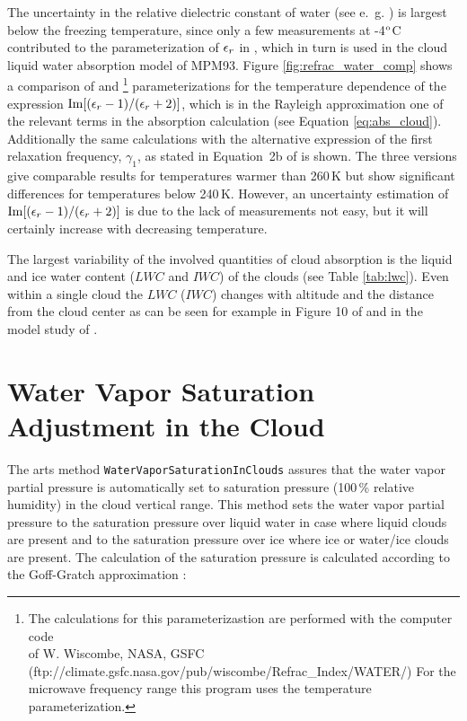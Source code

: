 The uncertainty in the relative dielectric constant of water 
(see e.~g. \citet{liptonetal:99}) is largest below the freezing 
temperature, since only a few measurements at -4$^{\rm o}$C 
contributed to the parameterization of $\epsilon_r$ in \citet{liebeetal:91}, 
which in turn is used in the cloud liquid water absorption model of MPM93. 
Figure \ref{fig:refrac_water_comp} shows a comparison of 
\citet{liebeetal:91} and \citet{ray:72}\footnote{{The calculations
  for this parameterizastion are performed with the computer code}\\{
   of W. Wiscombe, NASA, GSFC}\\
  (ftp://climate.gsfc.nasa.gov/pub/wiscombe/Refrac\_Index/WATER/)
  For the microwave frequency range this program uses the
  \citet{ray:72} temperature parameterization.} parameterizations 
for the temperature dependence of the expression
$\mathrm{Im}{[(\epsilon_r-1)/(\epsilon_r+2)]}$, which is in the Rayleigh approximation 
one of the relevant terms in the absorption calculation (see 
Equation \ref{eq:abs_cloud}). Additionally the same calculations with 
the alternative expression of the first  relaxation frequency, 
$\gamma_1$, as stated in Equation~2b of \citet{liebeetal:91} is shown. 
The three versions give comparable results for temperatures warmer 
than 260\,K but show significant  differences for temperatures below 
240\,K. However, an uncertainty estimation of $\mathrm{Im}{[(\epsilon_r-1)/(\epsilon_r+2)]}$ 
is due to the lack of measurements not easy, but it will certainly
increase with decreasing temperature.

The largest variability of the involved quantities of cloud absorption
is the liquid and ice water content ($LWC$ and $IWC$) of the clouds 
(see Table \ref{tab:lwc}). Even within a single cloud the $LWC$ ($IWC$) changes
with altitude and the distance from the cloud center as can be seen for
example in Figure 10 of \citet{ludlammason:57} and in the model study
of \citet{costaetal:00}.




\section{Water Vapor Saturation Adjustment in the Cloud}
\label{levelb:WV_sat_in_cloud}

The arts method {\tt WaterVaporSaturationInClouds{}} assures that 
the water vapor partial pressure is automatically set to 
saturation pressure (100\,\% relative humidity) in the cloud vertical
range.
This method sets the water vapor partial pressure to the 
saturation pressure over liquid water in case where liquid clouds 
are present and to the saturation pressure over ice where 
ice or water/ice clouds are present. The calculation of the 
saturation pressure is calculated according to the 
Goff-Gratch approximation \citep{liebeetal:93}:

